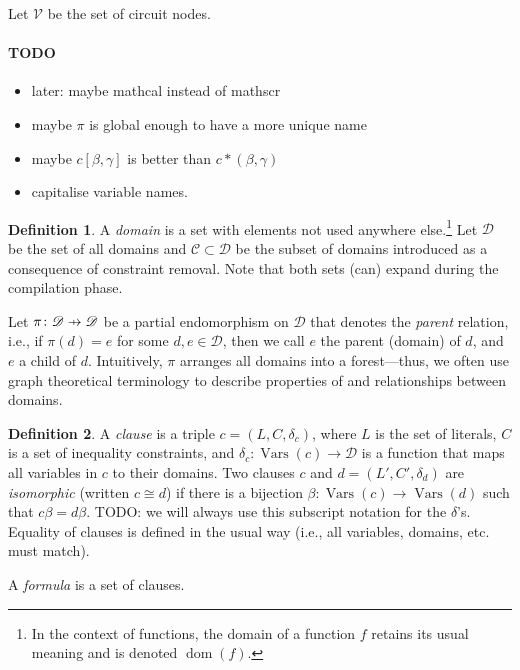\documentclass{article}
\theoremstyle{definition}
\newtheorem{definition}{Definition}
\newcommand\pfun{\mathrel{\ooalign{\hfil$\mapstochar\mkern5mu$\hfil\cr$\to$\cr}}}
\DeclareMathOperator{\dom}{dom}
\DeclareMathOperator{\Vars}{Vars}
\begin{document}
Let $\mathscr{V}$ be the set of circuit nodes.

\paragraph{TODO}
\begin{itemize}
\item later: maybe mathcal instead of mathscr
\item maybe $\pi$ is global enough to have a more unique name
\item maybe $c[\beta, \gamma]$ is better than $c \ast (\beta, \gamma)$
\item capitalise variable names.
\end{itemize}

\begin{definition}
  A \emph{domain} is a set with elements not used anywhere else.\footnote{In the context of functions, the domain of a function $f$ retains its usual meaning and is denoted $\dom(f)$.} Let $\mathscr{D}$ be the set of all domains and $\mathscr{C} \subset \mathscr{D}$ be the subset of domains introduced as a consequence of constraint removal. Note that both sets (can) expand during the compilation phase.

Let $\pi\colon \mathscr{D} \pfun \mathscr{D}$ be a partial endomorphism on $\mathscr{D}$ that denotes the \emph{parent} relation, i.e., if $\pi(d) = e$ for some $d, e \in \mathscr{D}$, then we call $e$ the parent (domain) of $d$, and $e$ a child of $d$. Intuitively, $\pi$ arranges all domains into a forest---thus, we often use graph theoretical terminology to describe properties of and relationships between domains.
\end{definition}

\begin{definition}
  A \emph{clause} is a triple $c = (L, C, \delta_c)$, where $L$ is the set of literals, $C$ is a set of inequality constraints, and $\delta_c\colon \Vars(c) \to \mathscr{D}$ is a function that maps all variables in $c$ to their domains. Two clauses $c$ and $d = (L', C', \delta_d)$ are \emph{isomorphic} (written $c \cong d$) if there is a bijection $\beta\colon \Vars(c) \to \Vars(d)$ such that $c\beta = d\beta$. TODO: we will always use this subscript notation for the $\delta$'s. Equality of clauses is defined in the usual way (i.e., all variables, domains, etc. must match).
\end{definition}

A \emph{formula} is a set of clauses.
\end{document}
